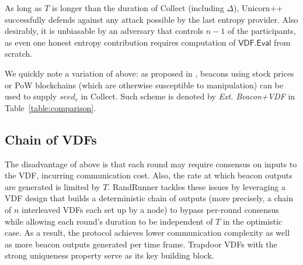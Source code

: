 \documentclass[conference]{IEEEtran}
\theoremstyle{definition}
\theoremstyle{remark}
\begin{document}
As long as $T$ is longer than the duration of Collect (including $\Delta$), Unicorn++ successfully defends against any attack possible by the last entropy provider. Also desirably, it is unbiasable by an adversary that controls $n - 1$ of the participants, as even one honest entropy contribution requires computation of $\mathsf{VDF.Eval}$ from scratch.

We quickly note a variation of above: as proposed in \cite{bunz2017proofs, bonneau2015bitcoin}, beacons using stock prices \cite{clark2010use} or PoW blockchains \cite{nakamoto2008bitcoin, bentov2016bitcoin, han2020randchain} (which are otherwise susceptible to manipulation) can be used to supply $seed_r$ in Collect. Such scheme is denoted by \textit{Ext. Beacon+VDF} in Table~\ref{table:comparison}.



\subsection{Chain of VDFs}
\label{subsection:randrunner}
The disadvantage of above is that each round may require consensus \cite{castro1999practical} on inputs to the VDF, incurring communication cost. Also, the rate at which beacon outputs are generated is limited by $T$. RandRunner \cite{schindler2021randrunner} tackles these issues by leveraging a VDF design that builds a deterministic chain of outputs (more precisely, a chain of $n$ interleaved VDFs each set up by a node) to bypass per-round consensus while allowing each round's duration to be independent of $T$ in the optimistic case. As a result, the protocol achieves lower communication complexity as well as more beacon outputs generated per time frame. Trapdoor VDFs \cite{wesolowski2019efficient} with the strong uniqueness property \cite{schindler2021randrunner} serve as its key building block.
\end{document}
